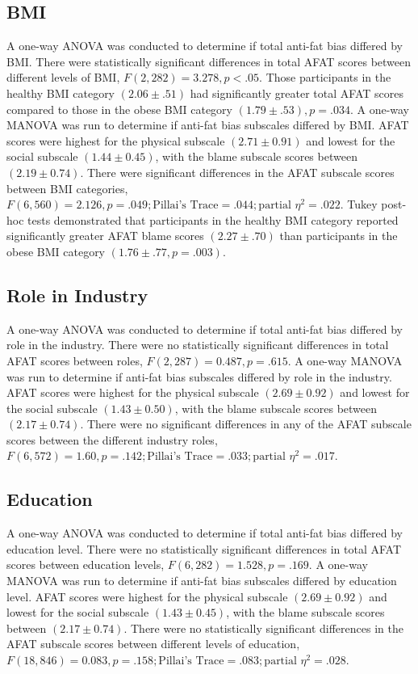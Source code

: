 \documentclass[
  jou,
  longtable,
  nolmodern,
  notxfonts,
  notimes,
  colorlinks=true,linkcolor=blue,citecolor=blue,urlcolor=blue]{apa7}
\begin{document}
\subsection{BMI}\label{bmi}

A one-way ANOVA was conducted to determine if total anti-fat bias
differed by BMI. There were statistically significant differences in
total AFAT scores between different levels of BMI,
\(F(2, 282) = 3.278, p < .05\). Those participants in the healthy BMI
category \((2.06 \pm .51)\) had significantly greater total AFAT scores
compared to those in the obese BMI category
\((1.79 \pm .53), p = .034\). A one-way MANOVA was run to determine if
anti-fat bias subscales differed by BMI. AFAT scores were highest for
the physical subscale \((2.71 \pm 0.91)\) and lowest for the social
subscale \((1.44 \pm 0.45)\), with the blame subscale scores between
\((2.19 \pm 0.74)\). There were significant differences in the AFAT
subscale scores between BMI categories,
\(F(6, 560) = 2.126, p = .049; \text{Pillai’s Trace} = .044; \text{partial } \eta^2 = .022\).
Tukey post-hoc tests demonstrated that participants in the healthy BMI
category reported significantly greater AFAT blame scores
\((2.27 \pm .70)\) than participants in the obese BMI category
\((1.76 \pm .77, p = .003)\).

\subsection{Role in Industry}\label{role-in-industry}

A one-way ANOVA was conducted to determine if total anti-fat bias
differed by role in the industry. There were no statistically
significant differences in total AFAT scores between roles,
\(F(2, 287) = 0.487, p = .615\). A one-way MANOVA was run to determine
if anti-fat bias subscales differed by role in the industry. AFAT scores
were highest for the physical subscale \((2.69 \pm 0.92)\) and lowest
for the social subscale \((1.43 \pm 0.50)\), with the blame subscale
scores between \((2.17 \pm 0.74)\). There were no significant
differences in any of the AFAT subscale scores between the different
industry roles,
\(F(6, 572) = 1.60, p = .142; \text{Pillai’s Trace} = .033; \text{partial } \eta^2 = .017\).

\subsection{Education}\label{education}

A one-way ANOVA was conducted to determine if total anti-fat bias
differed by education level. There were no statistically significant
differences in total AFAT scores between education levels,
\(F(6, 282) = 1.528, p = .169\). A one-way MANOVA was run to determine
if anti-fat bias subscales differed by education level. AFAT scores were
highest for the physical subscale \((2.69 \pm 0.92)\) and lowest for the
social subscale \((1.43 \pm 0.45)\), with the blame subscale scores
between \((2.17 \pm 0.74)\). There were no statistically significant
differences in the AFAT subscale scores between different levels of
education,
\(F(18,846) = 0.083, p = .158; \text{Pillai’s Trace} = .083; \text{partial } \eta^2 = .028\).
\end{document}
